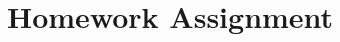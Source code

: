 \documentclass[10pt]{article}
\theoremstyle{plain}
\theoremstyle{definition}
\newtheorem{definition}{Definition}[section]
\theoremstyle{remark}
\theoremstyle{exercise-style}
\numberwithin{equation}{section}
\numberwithin{theorem}{section}
\numberwithin{remark}{section}
\begin{document}




\section{Homework Assignment}


\end{document}
